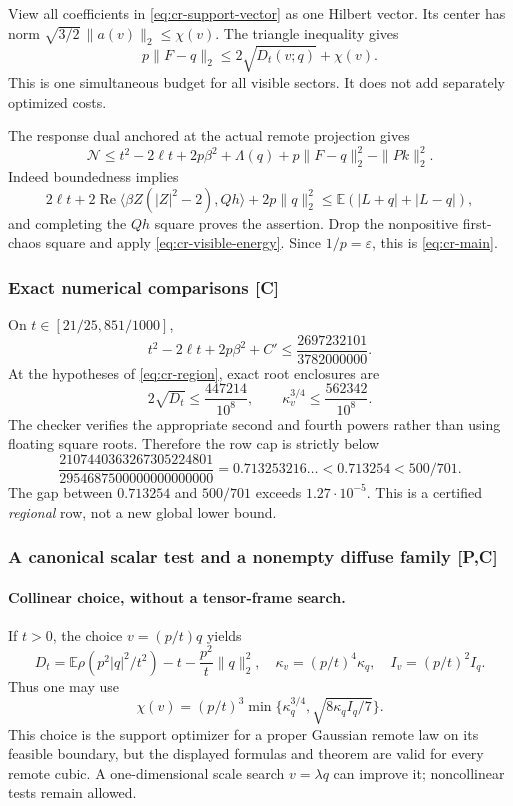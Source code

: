 View all coefficients in \eqref{eq:cr-support-vector} as one Hilbert
vector. Its center has norm $\sqrt{3/2}\,\|a(v)\|_2\le\chi(v)$.
The triangle inequality gives
\begin{equation}\label{eq:cr-visible-energy}
 p\|F-q\|_2\le2\sqrt{D_t(v;q)}+\chi(v).
\end{equation}
This is one simultaneous budget for all visible sectors. It does not
add separately optimized costs.

The response dual anchored at the actual remote projection gives
\[
 \mathcal N\le t^2-2\ell t+2p\beta^2+\Lambda(q)
                  +p\|F-q\|_2^2-\|Pk\|_2^2.
\]
Indeed boundedness implies
\[
 2\ell t+2\operatorname{Re}\langle\beta Z(|Z|^2-2),Qh\rangle
                   +2p\|q\|_2^2
 \le\mathbb E(|L+q|+|L-q|),
\]
and completing the $Qh$ square proves the assertion.
Drop the nonpositive first-chaos square and apply
\eqref{eq:cr-visible-energy}. Since $1/p=\varepsilon$, this is
\eqref{eq:cr-main}.

\subsubsection{Exact numerical comparisons [C]}

On $t\in[21/25,851/1000]$,
\[
 t^2-2\ell t+2p\beta^2+C'
 \le\frac{2697232101}{3782000000}.
\]
At the hypotheses of \eqref{eq:cr-region}, exact root enclosures are
\[
 2\sqrt{D_t}\le\frac{447214}{10^8},\qquad
 \kappa_v^{3/4}\le\frac{562342}{10^8}.
\]
The checker verifies the appropriate second and fourth powers rather
than using floating square roots. Therefore the row cap is strictly below
\[
 \frac{2107440363267305224801}{2954687500000000000000}
 =0.713253216\ldots<0.713254<500/701.
\]
The gap between $0.713254$ and $500/701$ exceeds $1.27\cdot10^{-5}$.
This is a certified \emph{regional} row, not a new global lower bound.

\subsubsection{A canonical scalar test and a nonempty diffuse family [P,C]}

\paragraph{Collinear choice, without a tensor-frame search.}
If $t>0$, the choice $v=(p/t)q$ yields
\[
 D_t=\mathbb E\rho(p^2|q|^2/t^2)-t-\frac{p^2}{t}\|q\|_2^2,
 \quad\kappa_v=(p/t)^4\kappa_q,\quad I_v=(p/t)^2I_q.
\]
Thus one may use
\[
 \chi(v)=(p/t)^3\min\{\kappa_q^{3/4},\sqrt{8\kappa_qI_q/7}\}.
\]
This choice is the support optimizer for a proper Gaussian remote law
on its feasible boundary, but the displayed formulas and theorem are
valid for every remote cubic. A one-dimensional scale search
$v=\lambda q$ can improve it; noncollinear tests remain allowed.

